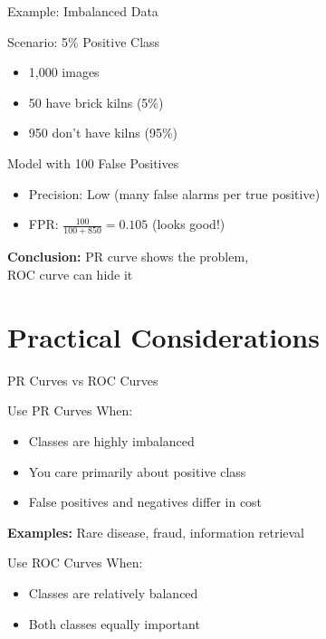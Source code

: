 \documentclass{beamer}
\begin{document}
\begin{frame}{Example: Imbalanced Data}
\begin{examplebox}{Scenario: 5\% Positive Class}
\begin{itemize}
    \item 1,000 images
    \item 50 have brick kilns (5\%)
    \item 950 don't have kilns (95\%)
\end{itemize}
\end{examplebox}

\vspace{0.3cm}

\begin{alertblock}{Model with 100 False Positives}
\begin{itemize}
    \item Precision: Low (many false alarms per true positive)
    \item FPR: $\frac{100}{100 + 850} = 0.105$ (looks good!)
\end{itemize}
\end{alertblock}

\vspace{0.2cm}

\textbf{Conclusion:} PR curve shows the problem, \\
ROC curve can hide it
\end{frame}

\section{Practical Considerations}

\begin{frame}{PR Curves vs ROC Curves}
\begin{keypointsbox}{Use PR Curves When:}
\begin{itemize}
    \item Classes are highly imbalanced
    \item You care primarily about positive class
    \item False positives and negatives differ in cost
\end{itemize}

\textbf{Examples:} Rare disease, fraud, information retrieval
\end{keypointsbox}

\vspace{0.3cm}

\begin{block}{Use ROC Curves When:}
\begin{itemize}
    \item Classes are relatively balanced
    \item Both classes equally important
\end{itemize}
\end{block}
\end{frame}
\end{document}
